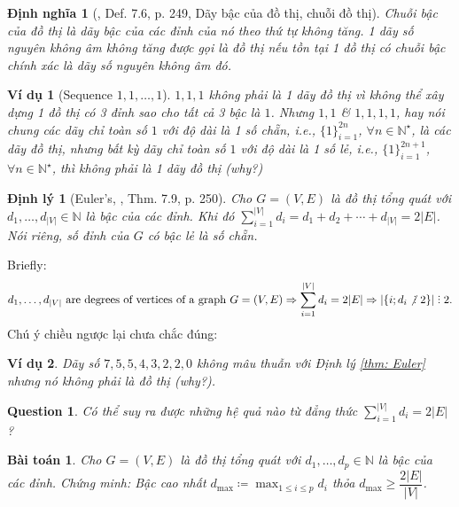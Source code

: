 \documentclass[oneside]{book}
\newtheorem{baitoan}{Bài toán}
\newtheorem{dinhly}{Định lý}
\newtheorem{dinhnghia}{Định nghĩa}
\newtheorem{question}{Question}
\newtheorem{vidu}{Ví dụ}
\DeclareRobustCommand{\divby}{%
	\mathrel{\vbox{\baselineskip.65ex\lineskiplimit0pt\hbox{.}\hbox{.}\hbox{.}}}%
}
\begin{document}
\begin{dinhnghia}[\cite{Ha_Thanh_to_hop}, Def. 7.6, p. 249, Dãy bậc của đồ thị, chuỗi đồ thị]
	{\rm Chuỗi bậc} của đồ thị là dãy bậc của các đỉnh của nó theo thứ tự không tăng. 1 dãy số nguyên không âm không tăng được gọi là {\rm đồ thị} nếu tồn tại 1 đồ thị có chuỗi bậc chính xác là dãy số nguyên không âm đó.
\end{dinhnghia}

\begin{vidu}[Sequence $1,1,\ldots,1$]
	$1,1,1$ không phải là 1 dãy đồ thị vì không thể xây dựng 1 đồ thị có 3 đỉnh sao cho tất cả 3 bậc là $1$. Nhưng $1,1$ \& $1,1,1,1$, hay nói chung các dãy chỉ toàn số $1$ với độ dài là 1 số chẵn, i.e., $\{1\}_{i=1}^{2n}$, $\forall n\in\mathbb{N}^\star$, là các dãy đồ thị, nhưng bất kỳ dãy chỉ toàn số $1$ với độ dài là 1 số lẻ, i.e., $\{1\}_{i=1}^{2n+1}$, $\forall n\in\mathbb{N}^\star$, thì không phải là 1 dãy đồ thị (why?)
\end{vidu}

\begin{dinhly}[Euler's, \cite{Ha_Thanh_to_hop}, Thm. 7.9, p. 250]
	Cho $G = (V,E)$ là đồ thị tổng quát với $d_1,\ldots,d_{|V|}\in\mathbb{N}$ là bậc của các đỉnh. Khi đó $\sum_{i=1}^{|V|} d_i = d_1 + d_2 + \cdots + d_{|V|} = 2|E|$. Nói riêng, số đỉnh của $G$ có bậc lẻ là số chẵn.
\end{dinhly}
Briefly:
\begin{equation*}
	d_1,\ldots,d_{|V|}\mbox{ are degrees of vertices of a graph } G = (V,E)\Rightarrow\sum_{i=1}^{|V|} d_i = 2|E|\Rightarrow|\{i;d_i\not{\divby}\ 2\}|\divby2.
\end{equation*}
Chú ý chiều ngược lại chưa chắc đúng:
\begin{vidu}
	Dãy số $7,5,5,4,3,2,2,0$ không mâu thuẫn với Định lý \ref{thm: Euler} nhưng nó không phải là đồ thị (why?).
\end{vidu}

\begin{question}
	Có thể suy ra được những hệ quả nào từ đẳng thức $\sum_{i=1}^{|V|} d_i = 2|E|$?
\end{question}

\begin{baitoan}
	Cho $G = (V,E)$ là đồ thị tổng quát với $d_1,\ldots,d_p\in\mathbb{N}$ là bậc của các đỉnh. Chứng minh: Bậc cao nhất $d_{\max}\coloneqq\max_{1\le i\le p} d_i$ thỏa $d_{\max}\ge\dfrac{2|E|}{|V|}$.
\end{baitoan}
\end{document}
